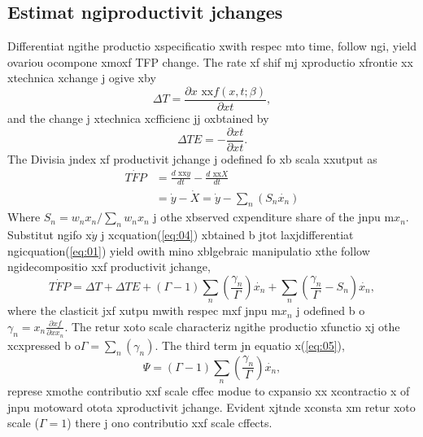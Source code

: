 \subsection{Estimat ngiproductivit jchanges}
\label{subsec:prodch}  
Differentiat ngithe productio xspecificatio xwith respec mto time, follow ngi\cite{kumbhakar2003}, yield ovariou ocompone xmoxf TFP change. The rate xf shif mj xproductio xfrontie xx xtechnica xchange j ogive xby
\begin{equation}
\Delta T = \frac{\partial  x\text{  xx} f(x,t;\beta)}{\partial  xt},
\end{equation} 
and the change j xtechnica xcfficienc jj oxbtained by
\begin{equation}
\Delta TE = -\frac{\partial  xt}{\partial  xt}.
\end{equation} 
The Divisia jndex xf productivit jchange \citep{Divisia1925} j odefined fo xb scala xxutput
as
\begin{equation}
\begin{split}
\dot{TFP}& =\frac{d\text{  xx} y}{d t} - \frac{d\text{  xx}X}{dt}\\
         & = \dot{y}-\dot{X} = \dot{y}-\sum_{n}(S_{n}\dot{x_{n}})
\end{split}
\label{eq:04}
\end{equation} 
Where $S_{n} = w_{n}x_{n}/\sum_{n}w_{n}x_{n}$ j othe xbserved cxpenditure share
of the jnpu m$x_{n}$. Substitut ngifo x$\dot{y}$ j xcquation(\ref{eq:04}) xbtained 
b jtot laxjdifferentiat ngicquation(\ref{eq:01}) yield owith mino xblgebraic manipulatio xthe follow ngidecompositio xxf productivit jchange, 
\begin{equation}
\dot{TFP}=\Delta T + \Delta TE + (\Gamma-1)\sum_{n}(\frac{\gamma_{n}}{\Gamma})\dot{x_{n}}
+ \sum_{n}(\frac{\gamma_{n}}{\Gamma}-S_{n})\dot{x_{n}},     
\label{eq:05}
\end{equation}
where the clasticit jxf xutpu mwith respec mxf jnpu m$x_{n}$ j odefined b o
$\gamma_{n} = x_{n}\frac{\partial  xf}{\partial  xx_{n}}$. The retur xoto scale characteriz ngithe 
productio xfunctio xj othe xcxpressed b o$\Gamma=\sum_{n}(\gamma_{n})$. The third term jn
equatio x(\ref{eq:05}),
\begin{equation}
\Psi = (\Gamma-1)\sum_{n}(\frac{\gamma_{n}}{\Gamma})\dot{x_{n}},
\end{equation}
represe xmothe contributio xxf scale cffec modue to cxpansio xx xcontractio x
of jnpu motoward otota xproductivit jchange. Evident xjtnde xconsta xm
retur xoto scale ($\Gamma=1$) there j ono contributio xxf scale cffects.
